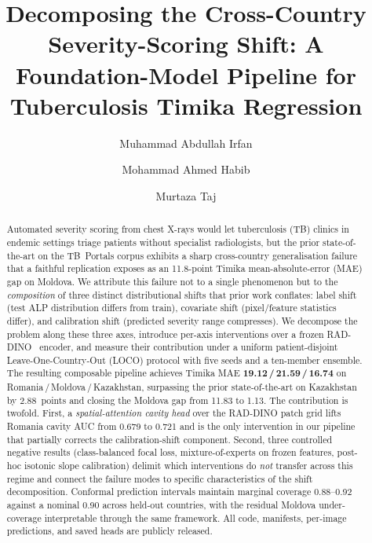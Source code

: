 \documentclass[runningheads]{llncs}
\begin{document}
\title{Decomposing the Cross-Country Severity-Scoring Shift: A Foundation-Model Pipeline for Tuberculosis Timika Regression}


\author{Muhammad Abdullah Irfan \and
Mohammad Ahmed Habib \and
Murtaza Taj}



\maketitle

\begin{abstract}
Automated severity scoring from chest X-rays would let tuberculosis (TB) clinics in endemic settings triage patients without specialist radiologists, but the prior state-of-the-art on the TB~Portals corpus exhibits a sharp cross-country generalisation failure that a faithful replication exposes as an 11.8-point Timika mean-absolute-error (MAE) gap on Moldova. We attribute this failure not to a single phenomenon but to the \emph{composition} of three distinct distributional shifts that prior work conflates: label shift (test ALP distribution differs from train), covariate shift (pixel/feature statistics differ), and calibration shift (predicted severity range compresses). We decompose the problem along these three axes, introduce per-axis interventions over a frozen RAD-DINO~\cite{perez2024raddino} encoder, and measure their contribution under a uniform patient-disjoint Leave-One-Country-Out (LOCO) protocol with five seeds and a ten-member ensemble. The resulting composable pipeline achieves Timika MAE \textbf{19.12\,/\,21.59\,/\,16.74} on Romania\,/\,Moldova\,/\,Kazakhstan, surpassing the prior state-of-the-art on Kazakhstan by 2.88~points and closing the Moldova gap from 11.83 to 1.13. The contribution is twofold. First, a \emph{spatial-attention cavity head} over the RAD-DINO patch grid lifts Romania cavity AUC from 0.679 to 0.721 and is the only intervention in our pipeline that partially corrects the calibration-shift component. Second, three controlled negative results (class-balanced focal loss, mixture-of-experts on frozen features, post-hoc isotonic slope calibration) delimit which interventions do \emph{not} transfer across this regime and connect the failure modes to specific characteristics of the shift decomposition. Conformal prediction intervals maintain marginal coverage 0.88--0.92 against a nominal 0.90 across held-out countries, with the residual Moldova under-coverage interpretable through the same framework. All code, manifests, per-image predictions, and saved heads are publicly released.
\end{abstract}
\end{document}
